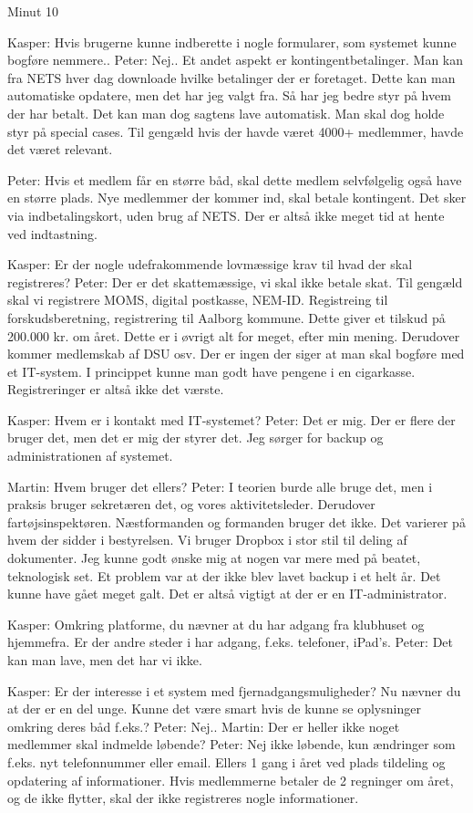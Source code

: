 \documentclass[a4paper]{article}
\begin{document}
Minut 10

Kasper: Hvis brugerne kunne indberette i nogle formularer, som systemet kunne bogføre nemmere..
Peter: Nej.. Et andet aspekt er kontingentbetalinger. Man kan fra NETS hver dag downloade hvilke betalinger der er foretaget. Dette kan man automatiske opdatere, men det har jeg valgt fra. Så har jeg bedre styr på hvem der har betalt. Det kan man dog sagtens lave automatisk. Man skal dog holde styr på special cases. Til gengæld hvis der havde været 4000+ medlemmer, havde det været relevant.



Peter: Hvis et medlem får en større båd, skal dette medlem selvfølgelig også have en større plads. Nye medlemmer der kommer ind, skal betale kontingent. Det sker via indbetalingskort, uden brug af NETS. Der er altså ikke meget tid at hente ved indtastning.

Kasper: Er der nogle udefrakommende lovmæssige krav til hvad der skal registreres?
Peter: Der er det skattemæssige, vi skal ikke betale skat. Til gengæld skal vi registrere MOMS, digital postkasse, NEM-ID. Registreing til forskudsberetning, registrering til Aalborg kommune. Dette giver et tilskud på 200.000 kr. om året. Dette er i øvrigt alt for meget, efter min mening. Derudover kommer medlemskab af DSU osv. Der er ingen der siger at man skal bogføre med et IT-system. I princippet kunne man godt have pengene i en cigarkasse. Registreringer er altså ikke det værste.

Kasper: Hvem er i kontakt med IT-systemet?
Peter: Det er mig. Der er flere der bruger det, men det er mig der styrer det. Jeg sørger for backup og administrationen af systemet.

Martin: Hvem bruger det ellers?
Peter: I teorien burde alle bruge det, men i praksis bruger sekretæren det, og vores aktivitetsleder. Derudover fartøjsinspektøren. Næstformanden og formanden bruger det ikke. Det varierer på hvem der sidder i bestyrelsen. Vi bruger Dropbox i stor stil til deling af dokumenter. Jeg kunne godt ønske mig at nogen var mere med på beatet, teknologisk set. Et problem var at der ikke blev lavet backup i et helt år. Det kunne have gået meget galt. Det er altså vigtigt at der er en IT-administrator.

Kasper: Omkring platforme, du nævner at du har adgang fra klubhuset og hjemmefra. Er der andre steder i har adgang, f.eks. telefoner, iPad's.
Peter: Det kan man lave, men det har vi ikke.

Kasper: Er der interesse i et system med fjernadgangsmuligheder? Nu nævner du at der er en del unge. Kunne det være smart hvis de kunne se oplysninger omkring deres båd f.eks.?
Peter: Nej..
Martin: Der er heller ikke noget medlemmer skal indmelde løbende?
Peter: Nej ikke løbende, kun ændringer som f.eks. nyt telefonnummer eller email. Ellers 1 gang i året ved plads tildeling og opdatering af informationer. Hvis medlemmerne betaler de 2 regninger om året, og de ikke flytter, skal der ikke registreres nogle informationer.
\end{document}
